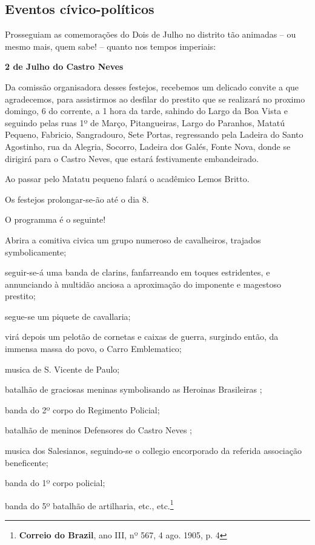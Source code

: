 \subsection{Eventos cívico-políticos}

Prosseguiam as comemorações do Dois de Julho no distrito tão animadas -- ou mesmo mais, quem sabe! -- quanto nos tempos imperiais:

\begin{citacao}
\textbf{2 de Julho do Castro Neves}

Da comissão organisadora desses festejos, recebemos um delicado convite a que agradecemos, para assistirmos ao desfilar do prestito que se realizará no proximo domingo, 6 do corrente, a 1 hora da tarde, sahindo do Largo da Boa Vista e seguindo pelas ruas 1º de Março, Pitangueiras, Largo do Paranhos, Matatú Pequeno, Fabricio, Sangradouro, Sete Portas, regressando pela Ladeira do Santo Agostinho, rua da Alegria, Socorro, Ladeira dos Galés, Fonte Nova, donde se dirigirá para o Castro Neves, que estará festivamente embandeirado.

Ao passar pelo Matatu pequeno falará o acadêmico Lemos Britto.

Os festejos prolongar-se-ão até o dia 8.

O programma é o seguinte!

Abrira a comitiva civica um grupo numeroso de cavalheiros, trajados symbolicamente;

seguir-se-á uma banda de clarins, fanfarreando em toques estridentes, e annunciando à multidão anciosa a aproximação do imponente e magestoso prestito;

segue-se um piquete de cavallaria;

virá depois um pelotão de cornetas e caixas de guerra, surgindo então, da immensa massa do povo, o Carro Emblematico;

musica de S. Vicente de Paulo;

batalhão de graciosas meninas symbolisando as \og Heroinas Brasileiras \fg{};

banda do 2º corpo do Regimento Policial;

batalhão de meninos \og Defensores do Castro Neves \fg{};

musica dos Salesianos, seguindo-se o collegio encorporado da referida associação beneficente;

banda do 1º corpo policial;

banda do 5º batalhão de artilharia, etc., etc.\footnote{\textbf{Correio do Brazil}, ano III, nº 567, 4 ago. 1905, p. 4}
\end{citacao}

